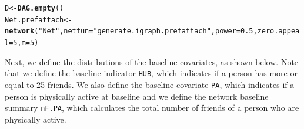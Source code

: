 \documentclass[english]{article}\usepackage[]{graphicx}\usepackage[]{color}
\makeatletter
\newcommand{\hlnum}[1]{\textcolor[rgb]{0.686,0.059,0.569}{#1}}%
\newcommand{\hlstr}[1]{\textcolor[rgb]{0.192,0.494,0.8}{#1}}%
\newcommand{\hlstd}[1]{\textcolor[rgb]{0.345,0.345,0.345}{#1}}%
\newcommand{\hlkwb}[1]{\textcolor[rgb]{0.69,0.353,0.396}{#1}}%
\newcommand{\hlkwc}[1]{\textcolor[rgb]{0.333,0.667,0.333}{#1}}%
\newcommand{\hlkwd}[1]{\textcolor[rgb]{0.737,0.353,0.396}{\textbf{#1}}}%
\newenvironment{kframe}{%
 \def\at@end@of@kframe{}%
 \ifinner\ifhmode%
  \def\at@end@of@kframe{\end{minipage}}%
  \begin{minipage}{\columnwidth}%
 \fi\fi%
 \def\FrameCommand##1{\hskip\@totalleftmargin \hskip-\fboxsep
 \colorbox{shadecolor}{##1}\hskip-\fboxsep
     \hskip-\linewidth \hskip-\@totalleftmargin \hskip\columnwidth}%
 \MakeFramed {\advance\hsize-\width
   \@totalleftmargin\z@ \linewidth\hsize
   \@setminipage}}%
 {\par\unskip\endMakeFramed%
 \at@end@of@kframe}
\newenvironment{knitrout}{}{} %
\theoremstyle{plain}
\theoremstyle{plain}
\makeatother
\begin{document}
\begin{knitrout}\footnotesize
{}\color{fgcolor}\begin{kframe}
\begin{alltt}
\hlstd{D} \hlkwb{<-} \hlkwd{DAG.empty}\hlstd{()}
\hlstd{Net.prefattach} \hlkwb{<-} \hlkwd{network}\hlstd{(}\hlstr{"Net"}\hlstd{,} \hlkwc{netfun} \hlstd{=} \hlstr{"generate.igraph.prefattach"}\hlstd{,} \hlkwc{power} \hlstd{=} \hlnum{0.5}\hlstd{,} \hlkwc{zero.appeal} \hlstd{=} \hlnum{5}\hlstd{,} \hlkwc{m} \hlstd{=} \hlnum{5}\hlstd{)}
\end{alltt}
\end{kframe}
\end{knitrout}

Next, we define the distributions of the baseline covariates, as shown below. Note that we define the baseline indicator \texttt{HUB}, which indicates if a person has more or equal to 25 friends. We also define the baseline covariate \texttt{PA}, which indicates if a person is physically active at baseline and we define the network baseline summary \texttt{nF.PA}, which calculates the total number of friends of a person who are physically active.
\end{document}
